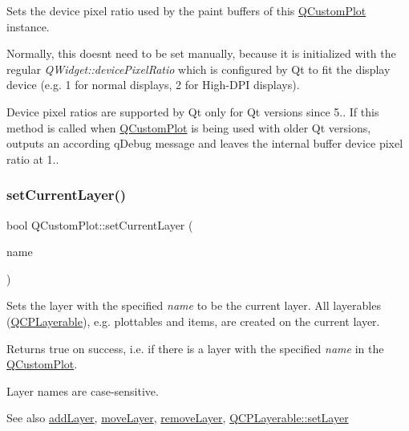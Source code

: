 Sets the device pixel ratio used by the paint buffers of this \mbox{\hyperlink{class_q_custom_plot}{Q\+Custom\+Plot}} instance.

Normally, this doesn\textquotesingle{}t need to be set manually, because it is initialized with the regular {\itshape Q\+Widget\+::device\+Pixel\+Ratio} which is configured by Qt to fit the display device (e.\+g. 1 for normal displays, 2 for High-\/\+D\+PI displays).

Device pixel ratios are supported by Qt only for Qt versions since 5.. If this method is called when \mbox{\hyperlink{class_q_custom_plot}{Q\+Custom\+Plot}} is being used with older Qt versions, outputs an according q\+Debug message and leaves the internal buffer device pixel ratio at 1.. \mbox{\label{class_q_custom_plot_a73a6dc47c653bb6f8f030abca5a11852}} 
\subsubsection{\texorpdfstring{set\+Current\+Layer()}{setCurrentLayer()}\hspace{0.1cm}{\footnotesize\ttfamily [1/2]}}
{\footnotesize\ttfamily bool Q\+Custom\+Plot\+::set\+Current\+Layer (\begin{DoxyParamCaption}\item[{const Q\+String \&}]{name }\end{DoxyParamCaption})}

Sets the layer with the specified {\itshape name} to be the current layer. All layerables (\mbox{\hyperlink{class_q_c_p_layerable}{Q\+C\+P\+Layerable}}), e.\+g. plottables and items, are created on the current layer.

Returns true on success, i.\+e. if there is a layer with the specified {\itshape name} in the \mbox{\hyperlink{class_q_custom_plot}{Q\+Custom\+Plot}}.

Layer names are case-\/sensitive.

\begin{DoxySeeAlso}{See also}
\mbox{\hyperlink{class_q_custom_plot_ad5255393df078448bb6ac83fa5db5f52}{add\+Layer}}, \mbox{\hyperlink{class_q_custom_plot_ae896140beff19424e9e9e02d6e331104}{move\+Layer}}, \mbox{\hyperlink{class_q_custom_plot_a40f75e342c5eaab6a86066a42a0e2a94}{remove\+Layer}}, \mbox{\hyperlink{class_q_c_p_layerable_ab0d0da6d2de45a118886d2c8e16d5a54}{Q\+C\+P\+Layerable\+::set\+Layer}} 
\end{DoxySeeAlso}
\mbox{\label{class_q_custom_plot_a23a4d3cadad1a0063c5fe19aac5659e6}} 
